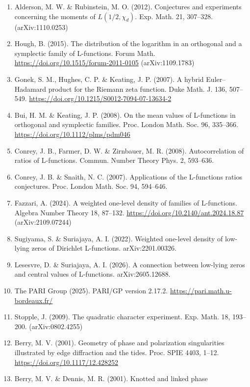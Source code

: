 \documentclass[
  10pt,
]{article}
\begin{document}
\begin{enumerate}
  \(L(1/2, \chi_d)\) II: the number field case. J. Eur. Math. Soc. 23,
  2051--2070. \url{https://doi.org/10.4171/JEMS/1049}
\item
  Alderson, M. W. \& Rubinstein, M. O. (2012). Conjectures and
  experiments concerning the moments of \(L(1/2, \chi_d)\). Exp. Math.
  21, 307--328. (arXiv:1110.0253)
\item
  Hough, B. (2015). The distribution of the logarithm in an orthogonal
  and a symplectic family of L-functions. Forum Math.
  \url{https://doi.org/10.1515/forum-2011-0105} (arXiv:1109.1783)
\item
  Gonek, S. M., Hughes, C. P. \& Keating, J. P. (2007). A hybrid
  Euler--Hadamard product for the Riemann zeta function. Duke Math. J.
  136, 507--549. \url{https://doi.org/10.1215/S0012-7094-07-13634-2}
\item
  Bui, H. M. \& Keating, J. P. (2008). On the mean values of L-functions
  in orthogonal and symplectic families. Proc. London Math. Soc. 96,
  335--366. \url{https://doi.org/10.1112/plms/pdm046}
\item
  Conrey, J. B., Farmer, D. W. \& Zirnbauer, M. R. (2008).
  Autocorrelation of ratios of L-functions. Commun. Number Theory Phys.
  2, 593--636.
\item
  Conrey, J. B. \& Snaith, N. C. (2007). Applications of the L-functions
  ratios conjectures. Proc. London Math. Soc. 94, 594--646.
\item
  Fazzari, A. (2024). A weighted one-level density of families of
  L-functions. Algebra Number Theory 18, 87--132.
  \url{https://doi.org/10.2140/ant.2024.18.87} (arXiv:2109.07244)
\item
  Sugiyama, S. \& Suriajaya, A. I. (2022). Weighted one-level density of
  low-lying zeros of Dirichlet L-functions. arXiv:2201.00326.
\item
  Lesesvre, D. \& Suriajaya, A. I. (2026). A connection between
  low-lying zeros and central values of L-functions. arXiv:2605.12688.
\item
  The PARI Group (2025). PARI/GP version 2.17.2.
  \url{https://pari.math.u-bordeaux.fr/}
\item
  Stopple, J. (2009). The quadratic character experiment. Exp. Math. 18,
  193--200. (arXiv:0802.4255)
\item
  Berry, M. V. (2001). Geometry of phase and polarization singularities
  illustrated by edge diffraction and the tides. Proc. SPIE 4403, 1--12.
  \url{https://doi.org/10.1117/12.428252}
\item
  Berry, M. V. \& Dennis, M. R. (2001). Knotted and linked phase

\end{enumerate}
\end{document}
